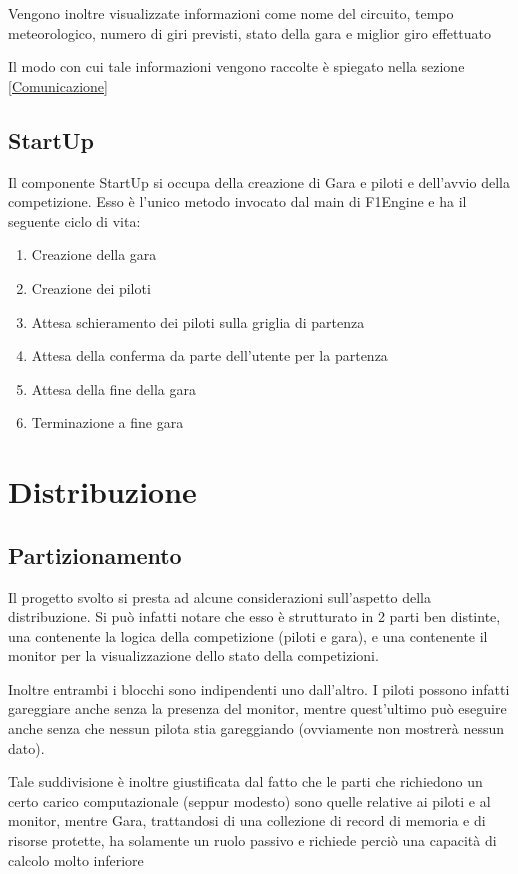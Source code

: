 \documentclass[a4paper,11pt, twoside]{book}
\begin{document}
      Vengono inoltre visualizzate informazioni come nome del circuito, tempo meteorologico, numero di giri previsti,
      stato della gara e miglior giro effettuato

      Il modo con cui tale informazioni vengono raccolte è spiegato nella sezione \ref{Comunicazione}
    
    \section{StartUp}
      Il componente StartUp si occupa della creazione di Gara e piloti e dell'avvio della competizione.
      Esso è l'unico metodo invocato dal main di F1Engine e ha il seguente ciclo di vita:
      
      \begin{enumerate}
	\item Creazione della gara
	\item Creazione dei piloti
	\item Attesa schieramento dei piloti sulla griglia di partenza
	\item Attesa della conferma da parte dell'utente per la partenza
	\item Attesa della fine della gara
	\item Terminazione a fine gara
      \end{enumerate}
      
  \chapter{Distribuzione}
    \section{Partizionamento}
      Il progetto svolto si presta ad alcune considerazioni sull'aspetto della distribuzione. 
      Si può infatti notare che esso è strutturato in 2 parti ben distinte, una contenente la logica della
      competizione (piloti e gara), e una contenente il monitor per la visualizzazione dello
      stato della competizioni.
      
      Inoltre entrambi i blocchi sono indipendenti uno dall'altro. I piloti possono infatti
      gareggiare anche senza la presenza del monitor, mentre quest'ultimo può eseguire anche senza che nessun pilota
      stia gareggiando (ovviamente non mostrerà nessun dato).
      
      Tale suddivisione è inoltre giustificata dal fatto che le parti che richiedono un certo carico computazionale 
      (seppur modesto) sono quelle relative ai piloti e al monitor, mentre
      Gara, trattandosi di una collezione di record di memoria e di risorse protette, ha solamente un ruolo passivo
      e richiede perciò una capacità di calcolo molto inferiore
      
\end{document}

